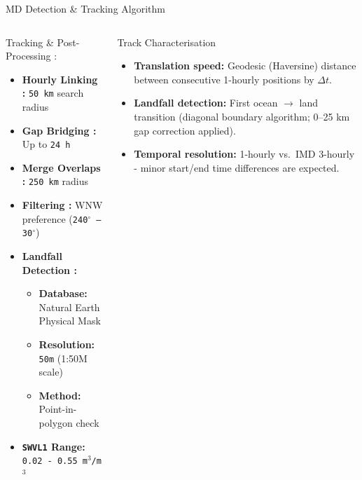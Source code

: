 \documentclass[10pt, aspectratio=169,t,xcolor=table]{beamer}
\begin{document}
\begin{frame}{MD Detection \& Tracking Algorithm}
\begin{columns}[T]
		\begin{block}{\small Tracking \& Post-Processing :}
			\footnotesize
			\begin{itemize}
				\item \textbf{Hourly Linking :} \texttt{50 km} search radius
				\item \textbf{Gap Bridging :} Up to \texttt{24 h}
				\item \textbf{Merge Overlaps :} \texttt{250 km} radius
				\item \textbf{Filtering :} WNW preference (\texttt{240$^{\circ}$ – 30$^{\circ}$})
			\end{itemize}
			\begin{itemize}
				\item \textbf{Landfall Detection :}
				      \begin{itemize}
					      \item \textbf{Database:} Natural Earth Physical Mask
					      \item \textbf{Resolution:} \texttt{50m} (1:50M scale)
					      \item \textbf{Method:} Point-in-polygon check
				      \end{itemize}
				\item \textbf{\texttt{SWVL1} Range\footnotemark[2] :} \texttt{0.02 - 0.55 m$^3$/m$^3$}
			\end{itemize}
		\end{block}

		\vspace{0.2cm}
		\begin{block}{\small Track Characterisation}
			\begin{itemize}\footnotesize
				\item \textbf{Translation speed:} Geodesic (Haversine) distance between
				      consecutive 1-hourly positions by $\Delta t$.
				\item \textbf{Landfall detection:} First ocean $\to$ land transition (diagonal
				      boundary algorithm; 0–25 km gap correction applied).
				\item \textbf{Temporal resolution:} 1-hourly vs.\ IMD 3-hourly - minor
				      start/end time differences are expected.
			\end{itemize}
		\end{block}
	\end{columns}
\end{frame}
\end{document}
